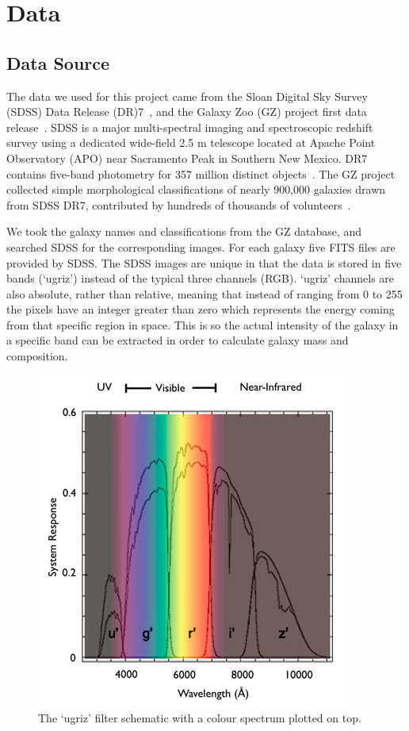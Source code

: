 \section{Data}
\label{sec:data}
\subsection{Data Source}
\label{sec:data_source}
The data we used for this project came from the Sloan Digital Sky Survey (SDSS) Data Release (DR)7~\cite{abazajian2009seventh}, and the Galaxy Zoo (GZ) project first data release~\cite{lintott2010galaxy}. 
SDSS is a major multi-spectral imaging and spectroscopic redshift survey using a dedicated wide-field 2.5 m telescope located at Apache Point Observatory (APO) near Sacramento Peak in Southern New Mexico.
DR7 contains five-band photometry for 357 million distinct objects~\cite{abazajian2009seventh}. 
The GZ project collected simple morphological classifications of nearly 900,000 galaxies drawn from SDSS DR7, contributed by hundreds of thousands of volunteers~\cite{lintott2010galaxy}. 

We took the galaxy names and classifications from the GZ database, and searched SDSS for the corresponding images. For each galaxy five FITS files are provided by SDSS.
The SDSS images are unique in that the data is stored in five bands (`ugriz') instead of the typical three channels (RGB). 
`ugriz' channels are also absolute, rather than relative, meaning that instead of ranging from 0 to 255 the pixels have an integer greater than zero which represents the energy coming from that specific region in space. 
This is so the actual intensity of the galaxy in a specific band can be extracted in order to calculate galaxy mass and composition.


\begin{figure}[h!]
	\centering
	\captionsetup{justification=centering}
	\includegraphics[scale=0.5]{Figures/filters.jpg}
	\caption{The `ugriz' filter schematic with a colour spectrum plotted on top.}
	\label{fig:filters}
\end{figure}



